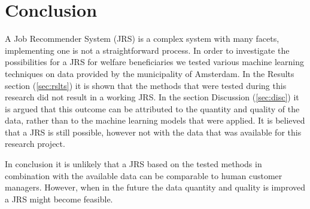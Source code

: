 \section{Conclusion}
\label{sec:concl}

A Job Recommender System (JRS) is a complex system with many facets, implementing one is not a straightforward process.
In order to investigate the possibilities for a JRS for welfare beneficiaries we tested various machine learning techniques on data provided by the municipality of Amsterdam.
In the Results section (\ref{sec:rslts}) it is shown that the methods that were tested during this research did not result in a working JRS.
In the section Discussion (\ref{sec:disc}) it is argued that this outcome can be attributed to the quantity and quality of the data, rather than to the machine learning models that were applied.
It is believed that a JRS is still possible, however not with the data that was available for this research project.

In conclusion it is unlikely that a JRS based on the tested methods in combination with the available data can be comparable to human customer managers.
However, when in the future the data quantity and quality is improved a JRS might become feasible.